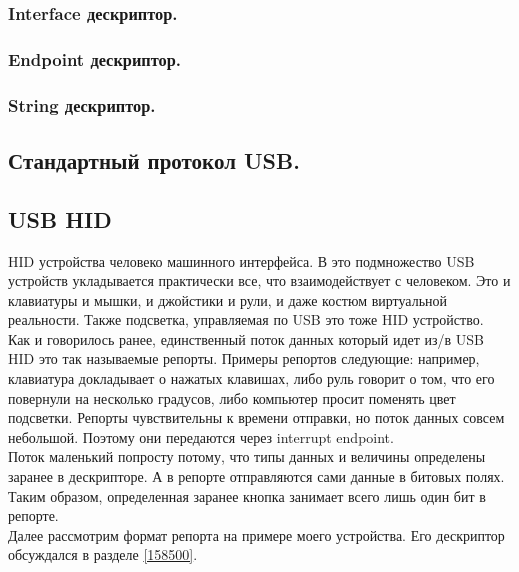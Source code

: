 \documentclass[12pt,a4paper]{article}
\begin{document}
\subsubsection{Interface дескриптор.}

\subsubsection{Endpoint дескриптор.}

\subsubsection{String дескриптор.}



\subsection{Стандартный протокол USB.}

\subsection{USB HID}
    HID устройства человеко машинного интерфейса. В это подмножество USB
    устройств укладывается практически все, что взаимодействует с человеком.
    Это и клавиатуры и мышки, и джойстики и рули, и даже костюм виртуальной
    реальности. Также подсветка, управляемая по USB это тоже HID устройство.\\
    Как и говорилось ранее, единственный поток данных который идет из/в USB HID
    это так называемые репорты. Примеры репортов следующие:
    например, клавиатура докладывает о нажатых клавишах,
    либо руль говорит о том, что его повернули на несколько градусов, либо
    компьютер просит поменять цвет подсветки. Репорты чувствительны к времени
    отправки, но поток данных совсем небольшой. Поэтому они передаются через
    interrupt endpoint.\\
    Поток маленький попросту потому, что типы данных и величины определены
    заранее в дескрипторе. А в репорте отправляются сами данные в битовых
    полях. Таким образом, определенная заранее кнопка занимает всего лишь один
    бит в репорте.\\
    Далее рассмотрим формат репорта на примере моего устройства. Его дескриптор
    обсуждался в разделе \ref{158500}.
\end{document}
